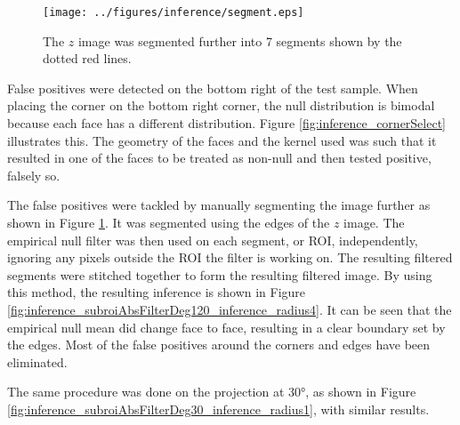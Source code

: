 \begin{figure}
  \centering
  \texttt{[image: ../figures/inference/segment.eps]}
  \caption{The $z$ image was segmented further into 7 segments shown by the dotted red lines.}
  \label{fig:inference_segmentFurther}
\end{figure}

False positives were detected on the bottom right of the test sample. When placing the corner on the bottom right corner, the null distribution is bimodal because each face has a different distribution. Figure \ref{fig:inference_cornerSelect} illustrates this. The geometry of the faces and the kernel used was such that it resulted in one of the faces to be treated as non-null and then tested positive, falsely so.

The false positives were tackled by manually segmenting the image further as shown in Figure \ref{fig:inference_segmentFurther}. It was segmented using the edges of the $z$ image. The empirical null filter was then used on each segment, or ROI, independently, ignoring any pixels outside the ROI the filter is working on. The resulting filtered segments were stitched together to form the resulting filtered image. By using this method, the resulting inference is shown in Figure \ref{fig:inference_subroiAbsFilterDeg120_inference_radius4}. It can be seen that the empirical null mean did change face to face, resulting in a clear boundary set by the edges. Most of the false positives around the corners and edges have been eliminated.

The same procedure was done on the projection at \ang{30}, as shown in Figure \ref{fig:inference_subroiAbsFilterDeg30_inference_radius1}, with similar results.

